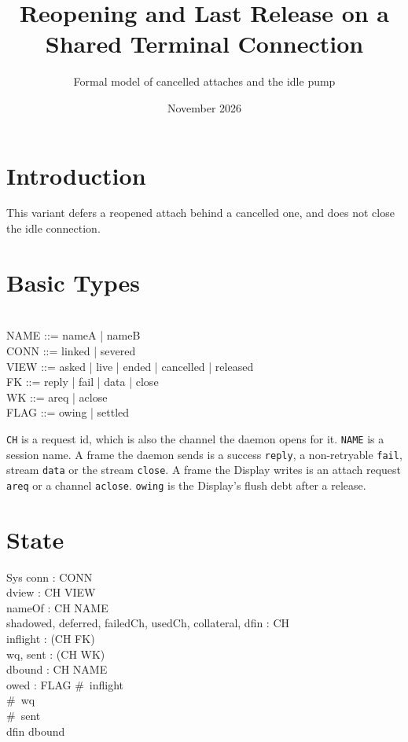 \documentclass[a4paper,10pt,fleqn]{article}
\begin{document}
\title{Reopening and Last Release on a Shared Terminal Connection}
\author{Formal model of cancelled attaches and the idle pump}
\date{November 2026}
\maketitle

\section{Introduction}

This variant defers a reopened attach behind a cancelled one, and does not close the idle connection.

\section{Basic Types}

\begin{zed}
  [CH] \\
  NAME ::= nameA | nameB \\
  CONN ::= linked | severed \\
  VIEW ::= asked | live | ended | cancelled | released \\
  FK ::= reply | fail | data | close \\
  WK ::= areq | aclose \\
  FLAG ::= owing | settled
\end{zed}

\texttt{CH} is a request id, which is also the channel the daemon opens for
it.  \texttt{NAME} is a session name.  A frame the daemon sends is a
success \texttt{reply}, a non-retryable \texttt{fail}, stream \texttt{data}
or the stream \texttt{close}.  A frame the Display writes is an attach
request \texttt{areq} or a channel \texttt{aclose}.  \texttt{owing} is the
Display's flush debt after a release.

\section{State}

\begin{schema}{Sys}
  conn : CONN \\
  dview : CH \pfun VIEW \\
  nameOf : CH \pfun NAME \\
  shadowed, deferred, failedCh, usedCh, collateral, dfin : \power CH \\
  inflight : \seq (CH \cross FK) \\
  wq, sent : \seq (CH \cross WK) \\
  dbound : CH \pfun NAME \\
  owed : FLAG
\where
  \#~inflight  \\
  \#~wq  \\
  \#~sent  \\
  dfin \subseteq \dom dbound
\end{schema}
\end{document}
